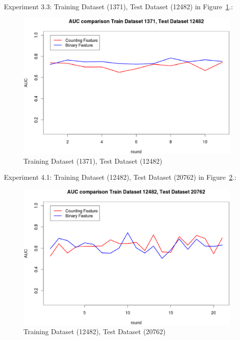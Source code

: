 \documentclass{sig-alternate}
\begin{document}
Experiment 3.3: Training Dataset  (1371), Test Dataset  (12482) in Figure~\ref{fig:fig8}.:
\begin{figure}[h]
\centering
\includegraphics[width=\columnwidth]{1371_12482.eps}
\caption{Training Dataset  (1371), Test Dataset  (12482)}
\label{fig:fig8}
\end{figure}

Experiment 4.1: Training Dataset  (12482), Test Dataset  (20762) in Figure~\ref{fig:fig9}.:
\begin{figure}[h]
\centering
\includegraphics[width=\columnwidth]{12482_20762.eps}
\caption{Training Dataset  (12482), Test Dataset  (20762)}
\label{fig:fig9}
\end{figure}
\end{document}
